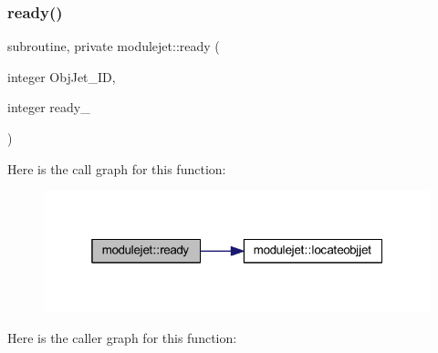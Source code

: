 \subsubsection{\texorpdfstring{ready()}{ready()}}
{\footnotesize\ttfamily subroutine, private modulejet\+::ready (\begin{DoxyParamCaption}\item[{integer}]{Obj\+Jet\+\_\+\+ID,  }\item[{integer}]{ready\+\_\+ }\end{DoxyParamCaption})\hspace{0.3cm}{\ttfamily [private]}}

Here is the call graph for this function\+:\nopagebreak
\begin{figure}[H]
\begin{center}
\leavevmode
\includegraphics[width=319pt]{namespacemodulejet_a08cf17884b67eb6e393c3f7553f6398f_cgraph}
\end{center}
\end{figure}
Here is the caller graph for this function\+:\nopagebreak
